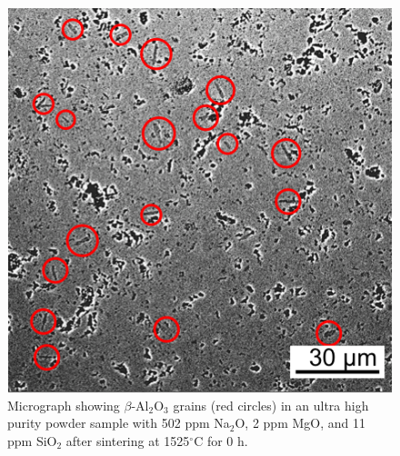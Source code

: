 \newpage
\begin{figure}[H]
	\centering
	\includegraphics{Chapter-5/Figures/Figure10.png}
	\caption{Micrograph showing $\beta$-Al$_{2}$O$_{3}$ grains (red circles) in an ultra high purity powder sample with 502 ppm Na$_{2}$O, 2 ppm MgO, and 11 ppm SiO$_{2}$ after sintering at 1525$^{\circ}$C for 0 h.}
	\label{Ch5-figure:Figure10}
\end{figure}

